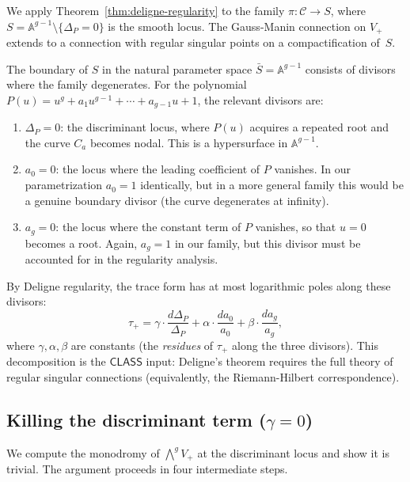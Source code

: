\documentclass[11pt]{article}
\theoremstyle{plain}
\theoremstyle{definition}
\theoremstyle{remark}
\newcommand{\CLASS}{\mathsf{CLASS}}
\begin{document}
We apply Theorem~\ref{thm:deligne-regularity} to the family $\pi: \mathcal{C} \to S$,
where $S = \mathbb{A}^{g-1} \setminus \{\Delta_P = 0\}$ is the smooth locus.
The Gauss-Manin connection on $V_+$ extends to a connection with regular
singular points on a compactification of~$S$.

The boundary of $S$ in the natural parameter space $\bar{S} = \mathbb{A}^{g-1}$
consists of divisors where the family degenerates.  For the polynomial
$P(u) = u^g + a_1 u^{g-1} + \cdots + a_{g-1}u + 1$, the relevant divisors are:
\begin{enumerate}[label=(\arabic*)]
  \item $\Delta_P = 0$: the discriminant locus, where $P(u)$ acquires a
    repeated root and the curve $C_a$ becomes nodal.  This is a hypersurface
    in $\mathbb{A}^{g-1}$.
  \item $a_0 = 0$: the locus where the leading coefficient of $P$ vanishes.
    In our parametrization $a_0 = 1$ identically, but in a more general
    family this would be a genuine boundary divisor (the curve degenerates
    at infinity).
  \item $a_g = 0$: the locus where the constant term of $P$ vanishes,
    so that $u = 0$ becomes a root.  Again, $a_g = 1$ in our family,
    but this divisor must be accounted for in the regularity analysis.
\end{enumerate}

By Deligne regularity, the trace form has at most logarithmic poles along
these divisors:
\begin{equation}\label{eq:deligne}
  \tau_+ = \gamma \cdot \frac{d\Delta_P}{\Delta_P}
           + \alpha \cdot \frac{da_0}{a_0}
           + \beta \cdot \frac{da_g}{a_g},
\end{equation}
where $\gamma, \alpha, \beta$ are constants (the \emph{residues} of $\tau_+$
along the three divisors).  This decomposition is the $\CLASS$ input:
Deligne's theorem requires the full theory of regular singular connections
(equivalently, the Riemann-Hilbert correspondence).

\subsection{Killing the discriminant term ($\gamma = 0$)}\label{subsec:kill-gamma}

We compute the monodromy of $\bigwedge^g V_+$ at the discriminant locus
and show it is trivial.  The argument proceeds in four intermediate steps.
\end{document}
